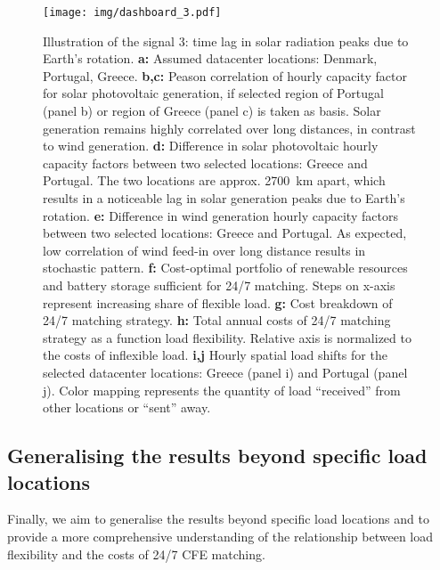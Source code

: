 \begin{figure}
    \centering
    \texttt{[image: img/dashboard\_3.pdf]}
    \caption{Illustration of the signal 3: time lag in solar radiation peaks due to Earth's rotation.
    \textbf{a:} Assumed datacenter locations: Denmark, Portugal, Greece.
    \textbf{b,c:} Peason correlation of hourly capacity factor for solar photovoltaic generation, if selected region of Portugal (panel b) or region of Greece (panel c) is taken as basis. Solar generation remains highly correlated over long distances, in contrast to wind generation.
    \textbf{d:} Difference in solar photovoltaic hourly capacity factors between two selected locations: Greece and Portugal. The two locations are approx. 2700~km apart, which results in a noticeable lag in solar generation peaks due to Earth's rotation.
    \textbf{e:} Difference in wind generation hourly capacity factors between two selected locations: Greece and Portugal. As expected, low correlation of wind feed-in over long distance results in stochastic pattern.
    \textbf{f:} Cost-optimal portfolio of renewable resources and battery storage sufficient for 24/7 matching. Steps on x-axis represent increasing share of flexible load.
    \textbf{g:} Cost breakdown of 24/7 matching strategy.
    \textbf{h:} Total annual costs of 24/7 matching strategy as a function load flexibility. Relative axis is normalized to the costs of inflexible load.
    \textbf{i,j} Hourly spatial load shifts for the selected datacenter locations: Greece (panel i) and Portugal (panel j). Color mapping represents the quantity of load \enquote{received} from other locations or \enquote{sent} away.}
    \label{fig:dashboard3}
\end{figure}


\subsection{Generalising the results beyond specific load locations}
\label{ssec:section4}

Finally, we aim to generalise the results beyond specific load locations and to provide a more comprehensive understanding of the relationship between load flexibility and the costs of 24/7 CFE matching. 

